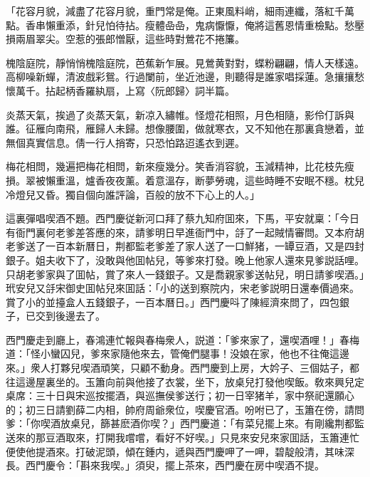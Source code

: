 \begin{myquote}
「花容月貌，減盡了花容月貌，重門常是俺。正東風料峭，細雨連纖，落紅千萬點。香串懶重添，針兒怕待拈。瘦體喦喦，鬼病懨懨，俺將這舊恩情重檢點。愁壓損兩眉翠尖。空惹的張郎憎厭，這些時對鶯花不捲簾。

槐陰庭院，靜悄悄槐陰庭院，芭蕉新乍展。見鶯黄對對，蝶粉翩翩，情人天樣遠。高柳噪新蟬，清波戲彩鴛。行過闌前，坐近池邊，則聽得是誰家唱採蓮。急攘攘愁懷萬千。拈起柄香羅紈扇，上寫〈阮郎歸〉詞半篇。

炎蒸天氣，挨過了炎蒸天氣，新凉入繡帷。怪燈花相照，月色相隨，影伶仃訴與誰。征雁向南飛，雁歸人未歸。想像腰圍，做就寒衣，又不知他在那裏貪戀着，並無個真實信息。倩一行人捎寄，只恐怕路迢遙衣到遲。

梅花相問，幾遍把梅花相問，新來瘦幾分。笑香消容貌，玉減精神，比花枝先瘦損。翠被懶重溫，爐香夜夜薰。着意溫存，断夢勞魂，這些時睡不安眠不穩。枕兒冷燈兒又昏。獨自個向誰評論，百般的放不下心上的人。」
\end{myquote}

這裏彈唱喫酒不題。西門慶従新河口拜了蔡九知府囬來，下馬，平安就稟：「今日有衙門裏何老爹差答應的來，請爹明日早進衙門中，㧱了一起賊情審問。又本府胡老爹送了一百本新曆日，荆都監老爹差了家人送了一口鮮猪，一罈豆酒，又是四封銀子。姐夫收下了，没敢與他囬帖兒，等爹來打發。晚上他家人還來見爹説話哩。只胡老爹家與了囬帖，賞了來人一錢銀子。又是喬親家爹送帖兒，明日請爹喫酒。」玳安兒又㧱宋御史囬帖兒來囬話：「小的送到察院内，宋老爹説明日還奉價過來。賞了小的並擡盒人五錢銀子，一百本曆日。」西門慶呌了陳經濟來問了，四包銀子，已交到後邊去了。

西門慶走到廳上，春鴻連忙報與春梅衆人，説道：「爹來家了，還喫酒哩！」春梅道：「怪小蠻囚兒，爹來家隨他來去，管俺們腿事！没娘在家，他也不往俺這邊來。」衆人打夥兒喫酒頑笑，只顧不動身。西門慶到上房，大妗子、三個姑子，都往這邊屋裏坐的。玉簫向前與他接了衣裳，坐下，放桌兒打發他喫飯。敎來興兒定桌席：三十日與宋巡按擺酒，與巡撫侯爹送行；初一日宰猪羊，家中祭祀還願心的；初三日請劉薛二内相，帥府周爺衆位，喫慶官酒。吩咐已了，玉簫在傍，請問爹：「你喫酒放桌兒，篩甚麽酒你喫？」西門慶道：「有菜兒擺上來。有剛纔荆都監送來的那豆酒取來，打開我嚐嚐，看好不好喫。」只見來安兒來家囬話，玉簫連忙便使他提酒來。打破泥頭，傾在鍾内，遞與西門慶呷了一呷，碧靛般清，其味深長。西門慶令：「斟來我喫。」須臾，擺上茶來，西門慶在房中喫酒不提。

